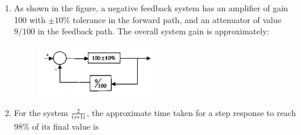 \documentclass[12pt]{article}
\theoremstyle{remark}
\begin{document}
\begin{enumerate}
\item As shown in the figure, a negative feedback system has an amplifier of gain 100 with $\pm10\%$ tolerance in the forward path, and an attenuator of value $9/100$ in the feedback path. The overall system gain is approximately:
\begin{figure}[H]
    \centering
    \includegraphics[width=0.5\textwidth]{Figs/Q10.png}
    \caption{}
    \label{fig:1.5}
\end{figure}
\begin{enumerate}
\end{enumerate}
\hfill{}

\item For the system $\frac{2}{\brak{s+1}}$, the approximate time taken for a step response to reach 98\% of its final value is
\begin{enumerate}
\end{enumerate}
\hfill{}


\end{enumerate}
\end{document}
